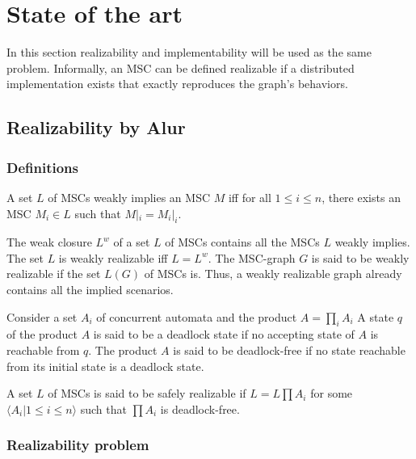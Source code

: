\section{State of the art}

In this section realizability and implementability will be used as the same problem.
Informally, an MSC can be defined realizable if a distributed 
implementation exists that exactly reproduces the graph's behaviors.

\subsection{Realizability by Alur}

\subsubsection{Definitions}

\begin{definition}
A set $L$ of MSCs weakly implies an MSC $M$ iff for all $1\leq i \leq n$, 
there exists an MSC $M_i \in L$ such that $M|_i = M_i|_i$.
\end{definition}

\begin{definition}
The weak closure $L^w$ of a set $L$ of MSCs contains all the MSCs $L$ weakly implies.
The set $L$ is weakly realizable iff $L=L^w$. The MSC-graph $G$ is said to be weakly
realizable if the set $L(G)$ of MSCs is. Thus, a weakly realizable graph already contains
all the implied scenarios.
\end{definition}

\begin{definition}
Consider a set $A_i$ of concurrent automata and the product $A =\prod_i A_i$
A state $q$ of the product $A$ is said to be a deadlock state if no accepting state of $A$ is reachable from $q$.
The product $A$ is said to be deadlock-free if no state reachable from its initial state is a deadlock state.
\end{definition}

\begin{definition}
A set $L$ of MSCs is said to be safely realizable if $L=L\prod A_i$ for some $\langle A_i | 1\leq i \leq n \rangle$
such that $\prod A_i$ is deadlock-free.
\end{definition}

\subsubsection{Realizability problem}


